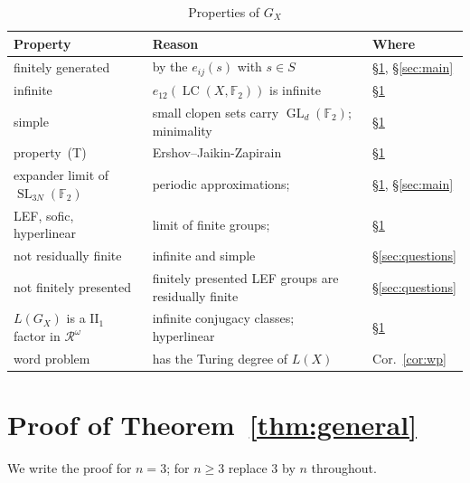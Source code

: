 \documentclass[11pt]{amsart}
\newcommand{\F}{\mathbb F}
\newcommand{\LC}{\operatorname{LC}}
\newcommand{\GL}{\operatorname{GL}}
\newcommand{\SL}{\operatorname{SL}}
\begin{document}
\begin{table}[t]
\caption{Properties of $G_X$}\label{tab:props}
\centering\small
\begin{tabular}{@{}lll@{}}
\toprule
Property & Reason & Where\\
\midrule
finitely generated & by the $e_{ij}(s)$ with $s\in S$ & \S\ref{sec:proof}, \S\ref{sec:main}\\
infinite & $e_{12}(\LC(X,\F_2))$ is infinite & \S\ref{sec:proof}\\
simple & small clopen sets carry $\GL_d(\F_2)$; minimality & \S\ref{sec:proof}\\
property~\textup{(T)} & Ershov--Jaikin-Zapirain~\cite{EJZ} & \S\ref{sec:proof}\\
expander limit of $\SL_{3N}(\F_2)$ & periodic approximations;~\cite{EJZ,Margulis,Kassabov} & \S\ref{sec:proof}, \S\ref{sec:main}\\
LEF, sofic, hyperlinear & limit of finite groups;~\cite{Pestov,ElekSzabo} & \S\ref{sec:proof}\\
not residually finite & infinite and simple & \S\ref{sec:questions}\\
not finitely presented & finitely presented LEF groups are residually finite~\cite{Stepin,VershikGordon} & \S\ref{sec:questions}\\
$L(G_X)$ is a $\mathrm{II}_1$ factor in $\mathcal R^\omega$ & infinite conjugacy classes; hyperlinear & \S\ref{sec:proof}\\
word problem & has the Turing degree of $L(X)$ & Cor.~\ref{cor:wp}\\
\bottomrule
\end{tabular}
\end{table}

\section{Proof of Theorem~\ref{thm:general}}\label{sec:proof}

We write the proof for $n=3$; for $n\ge3$ replace $3$ by $n$ throughout.
\end{document}
